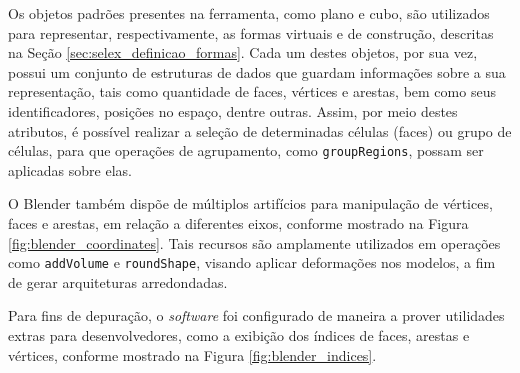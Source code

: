 Os objetos padrões presentes na ferramenta, como plano e cubo, são utilizados para representar, respectivamente, as formas virtuais e de construção, descritas na Seção \ref{sec:selex_definicao_formas}. Cada um destes objetos, por sua vez, possui um conjunto de estruturas de dados que guardam informações sobre a sua representação, tais como quantidade de faces, vértices e arestas, bem como seus identificadores, posições no espaço, dentre outras. Assim, por meio destes atributos, é possível realizar a seleção de determinadas células (faces) ou grupo de células, para que operações de agrupamento, como \texttt{groupRegions}, possam ser aplicadas sobre elas.

O Blender também dispõe de múltiplos artifícios para manipulação de vértices, faces e arestas, em relação a diferentes eixos, conforme mostrado na Figura \ref{fig:blender_coordinates}. Tais recursos são amplamente utilizados em operações como \texttt{addVolume} e \texttt{roundShape}, visando aplicar deformações nos modelos, a fim de gerar arquiteturas arredondadas.

\begin{figure}[h!]
	\centering
	\captionsetup{width=15cm}
	{}	
\end{figure}

Para fins de depuração, o \textit{software} foi configurado de maneira a prover utilidades extras para desenvolvedores, como a exibição dos índices de faces, arestas e vértices, conforme mostrado na Figura \ref{fig:blender_indices}.

\begin{figure}[h!]
	\centering
	\captionsetup{width=15cm}
	{}	
\end{figure}

